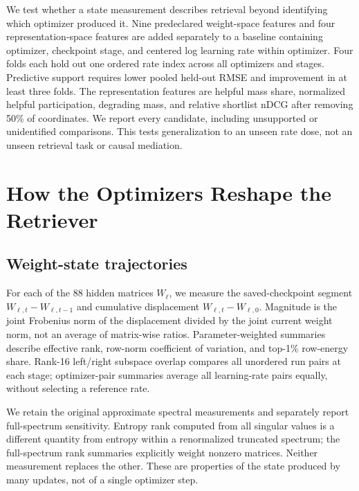 \documentclass[11pt]{article}
\begin{document}
We test whether a state measurement describes retrieval beyond identifying which optimizer
produced it. Nine predeclared weight-space features and four representation-space features are
added separately to a baseline containing optimizer, checkpoint stage, and centered log learning
rate within optimizer. Four folds each hold out one ordered rate index across all optimizers and
stages. Predictive support requires lower pooled held-out RMSE and improvement in at least three
folds. The representation features are helpful mass share, normalized helpful participation,
degrading mass, and relative shortlist nDCG after removing 50\% of coordinates. We report every
candidate, including unsupported or unidentified comparisons. This tests generalization to an
unseen rate dose, not an unseen retrieval task or causal mediation.

\CorrectedMainSection

\section{How the Optimizers Reshape the Retriever}

\subsection{Weight-state trajectories}

For each of the 88 hidden matrices $W_\ell$, we measure the saved-checkpoint segment
$W_{\ell,t}-W_{\ell,t-1}$ and cumulative displacement $W_{\ell,t}-W_{\ell,0}$. Magnitude is the
joint Frobenius norm of the displacement divided by the joint current weight norm, not an average
of matrix-wise ratios. Parameter-weighted summaries describe effective rank, row-norm coefficient
of variation, and top-1\% row-energy share. Rank-16 left/right subspace overlap compares all
unordered run pairs at each stage; optimizer-pair summaries average all learning-rate pairs
equally, without selecting a reference rate.

We retain the original approximate spectral measurements and separately report full-spectrum
sensitivity. Entropy rank computed from all singular values is a different quantity from entropy
within a renormalized truncated spectrum; the full-spectrum rank summaries explicitly weight
nonzero matrices. Neither measurement replaces the other. These are properties of the state
produced by many updates, not of a single optimizer step.

\CorrectedWeightSpaceFinding
\end{document}
